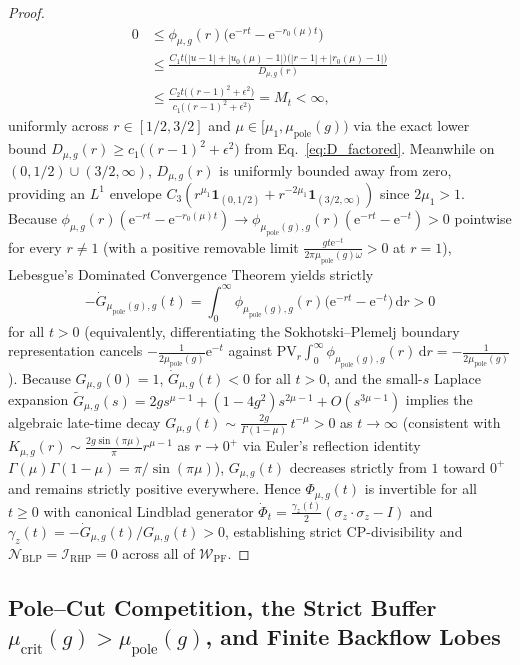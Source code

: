 \documentclass[twocolumn,10pt,amsmath,amssymb,floatfix]{revtex4-2}
\theoremstyle{plain}
\theoremstyle{definition}
\newcommand{\dd}{\mathrm{d}}
\newcommand{\ee}{\mathrm{e}}
\newcommand{\NBLP}{\mathcal{N}_{\mathrm{BLP}}}
\newcommand{\IRHP}{\mathcal{I}_{\mathrm{RHP}}}
\newcommand{\mupole}{\mu_{\mathrm{pole}}}
\newcommand{\mucrit}{\mu_{\mathrm{crit}}}
\begin{document}
\begin{proof}
\begin{align*}
0 &\le \phi_{\mu,g}(r)\big(\ee^{-rt} - \ee^{-r_0(\mu)t}\big) \\
&\le \frac{C_1 t\big(|u-1| + |u_0(\mu)-1|\big)\big(|r-1| + |r_0(\mu)-1|\big)}{D_{\mu,g}(r)} \\
&\le \frac{C_2 t\big((r-1)^2 + \epsilon^2\big)}{c_1\big((r-1)^2 + \epsilon^2\big)} = M_t < \infty,
\end{align*}
uniformly across $r \in [1/2, 3/2]$ and $\mu \in [\mu_1, \mupole(g))$ via the exact lower bound $D_{\mu,g}(r) \ge c_1\big((r-1)^2 + \epsilon^2\big)$ from Eq.~\eqref{eq:D_factored}. Meanwhile on $(0,1/2) \cup (3/2,\infty)$, $D_{\mu,g}(r)$ is uniformly bounded away from zero, providing an $L^1$ envelope $C_3(r^{\mu_1}\mathbf{1}_{(0,1/2)} + r^{-2\mu_1}\mathbf{1}_{(3/2,\infty)})$ since $2\mu_1 > 1$. Because $\phi_{\mu,g}(r)(\ee^{-rt} - \ee^{-r_0(\mu)t}) \to \phi_{\mupole(g),g}(r)(\ee^{-rt} - \ee^{-t}) > 0$ pointwise for every $r \neq 1$ (with a positive removable limit $\frac{gt\ee^{-t}}{2\pi\mupole(g)\omega} > 0$ at $r=1$), Lebesgue's Dominated Convergence Theorem yields strictly
\[
-\dot{G}_{\mupole(g),g}(t) = \int_0^\infty \phi_{\mupole(g),g}(r)\big(\ee^{-rt} - \ee^{-t}\big)\,\dd r > 0
\]
for all $t > 0$ (equivalently, differentiating the Sokhotski--Plemelj boundary representation cancels $-\frac{1}{2\mupole(g)}\ee^{-t}$ against $\mathrm{PV}_r\!\int_0^\infty \phi_{\mupole(g),g}(r)\,\dd r = -\frac{1}{2\mupole(g)}$).
Because $G_{\mu,g}(0) = 1$, $\dot{G}_{\mu,g}(t) < 0$ for all $t > 0$, and the small-$s$ Laplace expansion $\tilde{G}_{\mu,g}(s) = 2g s^{\mu-1} + (1-4g^2)s^{2\mu-1} + O(s^{3\mu-1})$ implies the algebraic late-time decay $G_{\mu,g}(t) \sim \frac{2g}{\Gamma(1-\mu)}\,t^{-\mu} > 0$ as $t \to \infty$ (consistent with $K_{\mu,g}(r) \sim \frac{2g\sin(\pi\mu)}{\pi}r^{\mu-1}$ as $r\to 0^+$ via Euler's reflection identity $\Gamma(\mu)\Gamma(1-\mu) = \pi/\sin(\pi\mu)$), $G_{\mu,g}(t)$ decreases strictly from $1$ toward $0^+$ and remains strictly positive everywhere. Hence $\Phi_{\mu,g}(t)$ is invertible for all $t \ge 0$ with canonical Lindblad generator $\dot{\Phi}_t = \frac{\gamma_z(t)}{2}(\sigma_z \cdot \sigma_z - I)$ and $\gamma_z(t) = -\dot{G}_{\mu,g}(t)/G_{\mu,g}(t) > 0$, establishing strict CP-divisibility and $\NBLP = \IRHP = 0$ across all of $\mathcal{W}_{\mathrm{PF}}$.
\end{proof}

\subsection{Pole--Cut Competition, the Strict Buffer \texorpdfstring{$\mucrit(g) > \mupole(g)$}{mu\_crit > mu\_pole}, and Finite Backflow Lobes}
\label{subsec:pole_cut}
\end{document}
